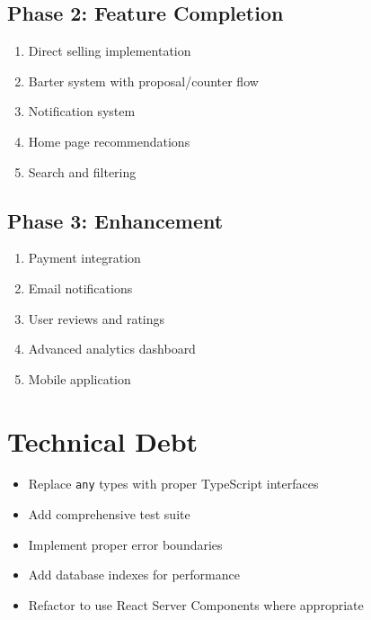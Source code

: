 \documentclass[12pt,a4paper]{report}
\begin{document}
\subsection{Phase 2: Feature Completion}

\begin{enumerate}
    \item Direct selling implementation
    \item Barter system with proposal/counter flow
    \item Notification system
    \item Home page recommendations
    \item Search and filtering
\end{enumerate}

\subsection{Phase 3: Enhancement}

\begin{enumerate}
    \item Payment integration
    \item Email notifications
    \item User reviews and ratings
    \item Advanced analytics dashboard
    \item Mobile application
\end{enumerate}

\section{Technical Debt}

\begin{itemize}
    \item Replace \texttt{any} types with proper TypeScript interfaces
    \item Add comprehensive test suite
    \item Implement proper error boundaries
    \item Add database indexes for performance
    \item Refactor to use React Server Components where appropriate
\end{itemize}

\appendix
\end{document}
